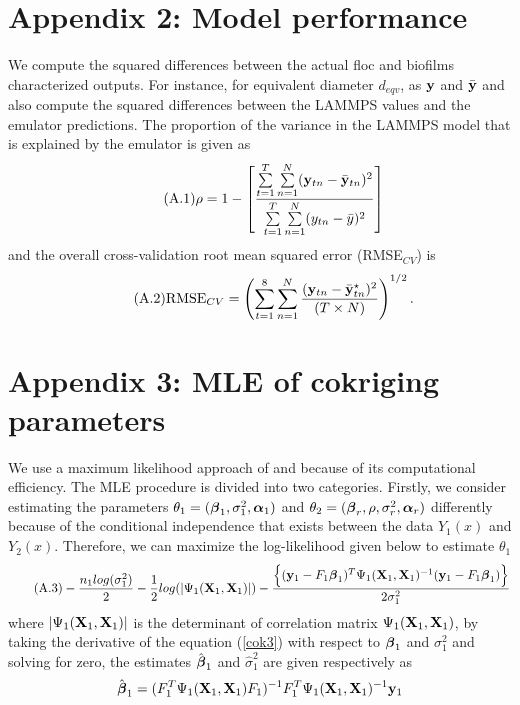 \begin{acknowledgements}
\section*{Appendix 2: Model performance}
We compute the squared differences between the actual floc and biofilms characterized outputs. For instance, for equivalent diameter $d_{eqv}$, as ${\bf y}$ and $\bar {{\bf y}}$ and also compute the squared differences between the LAMMPS values and the emulator predictions. The proportion of the variance in the LAMMPS model that is explained by the emulator is given as
\begin{align}\tag{A.1}\label{gaga4}
\rho=1-\left[\frac{\sum\limits_{t=1}^T\sum\limits_{n=1}^N
({\bf y}_{tn}-\bar {{\bf y}}_{tn})^2}
{\sum\limits_{t=1}^T\sum\limits_{n=1}^N
(y_{tn}-\bar y)^2}\right]
\end{align}
and the overall cross-validation root mean squared error (RMSE$_{CV}$) is
\begin{equation}\tag{A.2}\label{gaga4b}
\mbox{RMSE}_{CV}= \left(\sum\limits_{t=1}^8\sum\limits_{n=1}^N
\frac{({\bf y}_{tn}-\bar {{\bf y}}_{tn}^{\star})^2}{(T\times N)} \right)^{1/2}.
\end{equation}

\section*{Appendix 3: MLE of cokriging parameters}
We use a maximum likelihood approach of \citet{co3} and \citet{co4} because of its computational efficiency. The MLE procedure is divided into two categories. Firstly, we consider estimating the parameters $\theta_1=({\boldsymbol{\beta}}_1,\sigma_1^2,{\boldsymbol{\alpha}}_1)$ and  $\theta_2=({\boldsymbol{\beta}}_r,\rho,\sigma_r^2,{\boldsymbol{\alpha}}_r)$ differently because of the conditional independence that exists between the data $Y_1(x)$ and $Y_2(x)$. Therefore, we can maximize the log-likelihood given below to estimate $\theta_1$
\begin{equation}\tag{A.3}\label{cok3}
-\frac{n_1 log(\sigma_1^2)}{2} -  \frac{1}{2}log(|\Psi_1({\bf X}_1,{\bf X}_1)|) - \frac{ \Big \{({\bf y}_1-F_1 {\boldsymbol{\beta}}_1)^T \Psi_1({\bf X}_1,{\bf X}_1)^{-1}({\bf y}_1-F_1 {\boldsymbol{\beta}}_1)\Big\}}{2\sigma_1^2}
\end{equation}
where $|\Psi_1({\bf X}_1,{\bf X}_1)|$ is the determinant of correlation matrix $\Psi_1({\bf X}_1,{\bf X}_1)$, by taking the derivative of the equation (\ref{cok3}) with
respect to ${\boldsymbol{\beta}}_1$ and $\sigma_1^2$ and solving for zero, the estimates ${\hat{\boldsymbol{\beta}}}_1$ and $\hat\sigma_1^2$ are given respectively as
$${\hat{\boldsymbol{\beta}}}_1=(F_1^T \Psi_1({\bf X}_1,{\bf X}_1) F_1)^{-1}F_1^T\Psi_1({\bf X}_1,{\bf X}_1)^{-1}{\bf y}_1$$


\end{acknowledgements}
